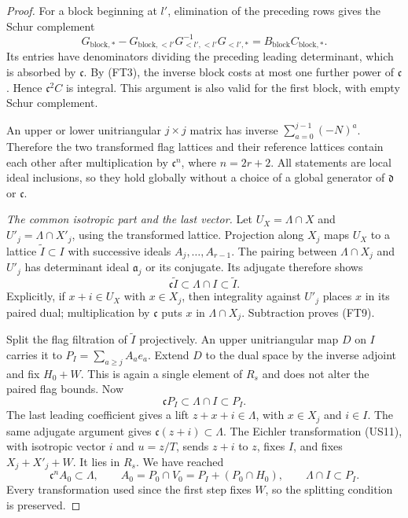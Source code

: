 \begin{proof}
For a block beginning at $l'$, elimination of the preceding
rows gives the Schur complement
\[
 G_{\mathrm{block},*}
  -G_{\mathrm{block},<l'}G_{<l',<l'}^{-1}G_{<l',*}
                       =B_{\mathrm{block}}C_{\mathrm{block},*}.
 \tag{FT8}
\]
Its entries have denominators dividing the preceding
leading determinant, which is absorbed by $\mathfrak c$.
By (FT3), the inverse block costs at most one further
power of $\mathfrak c$.  Hence $\mathfrak c^2C$ is
integral.  This argument is also valid for the first
block, with empty Schur complement.

An upper or lower unitriangular $j\times j$ matrix has
inverse $\sum_{a=0}^{j-1}(-N)^a$.  Therefore the two
transformed flag lattices and their reference lattices
contain each other after multiplication by
$\mathfrak c^n$, where $n=2r+2$.  All statements are
local ideal inclusions, so they hold globally without a
choice of a global generator of $\mathfrak d$ or
$\mathfrak c$.

\smallskip\noindent\emph{The common isotropic part and the last vector.}
Let $U_X=\Lambda\cap X$ and $U'_j=\Lambda\cap X'_j$,
using the transformed lattice.  Projection along $X_j$
maps $U_X$ to a lattice $\widetilde I\subset I$ with
successive ideals $A_j,\ldots,A_{r-1}$.  The pairing
between $\Lambda\cap X_j$ and $U'_j$ has determinant
ideal $\mathfrak a_j$ or its conjugate.  Its adjugate
therefore shows
\[
                      \mathfrak c\widetilde I
                           \subset\Lambda\cap I
                           \subset\widetilde I.
 \tag{FT9}
\]
Explicitly, if $x+i\in U_X$ with $x\in X_j$, then
integrality against $U'_j$ places $x$ in its paired
dual; multiplication by $\mathfrak c$ puts $x$ in
$\Lambda\cap X_j$.  Subtraction proves (FT9).

Split the flag filtration of $\widetilde I$ projectively.
An upper unitriangular map $D$ on $I$ carries it to
$P_I=\sum_{a\geq j}A_ae_a$.  Extend $D$ to the dual
space by the inverse adjoint and fix $H_0+W$.  This is
again a single element of $R_s$ and does not alter the
paired flag bounds.  Now
\[
                  \mathfrak cP_I\subset\Lambda\cap I\subset P_I.
 \tag{FT10}
\]
The last leading coefficient gives a lift
$z+x+i\in\Lambda$, with $x\in X_j$ and $i\in I$.
The same adjugate argument gives
$\mathfrak c(z+i)\subset\Lambda$.  The Eichler
transformation (US11), with isotropic vector $i$ and
$u=z/T$, sends $z+i$ to $z$, fixes $I$, and fixes
$X_j+X'_j+W$.  It lies in $R_s$.  We have reached
\[
 \mathfrak c^n A_0\subset\Lambda,
 \qquad A_0=P_0\cap V_0=P_I+(P_0\cap H_0),
 \qquad \Lambda\cap I\subset P_I.
 \tag{FT11}
\]
Every transformation used since the first step fixes $W$,
so the splitting condition is preserved.


\end{proof}
